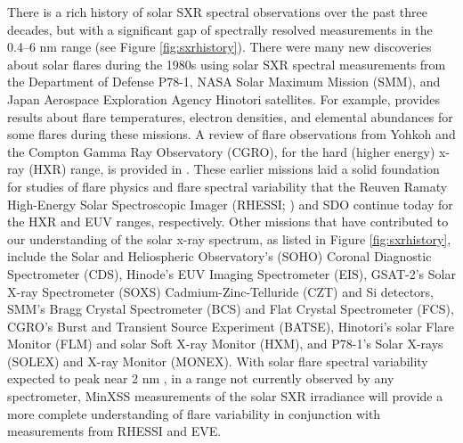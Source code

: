 There is a rich history of solar SXR spectral observations over the past three decades, but with a significant gap of spectrally resolved measurements in the 0.4–6 nm range (see Figure \ref{fig:sxrhistory}). There were many new discoveries about solar flares during the 1980s using solar SXR spectral measurements from the Department of Defense P78-1, NASA Solar Maximum Mission (SMM), and Japan Aerospace Exploration Agency Hinotori satellites. For example, \citet{Doschek1990} provides results about flare temperatures, electron densities, and elemental abundances for some flares during these missions. A review of flare observations from Yohkoh and the Compton Gamma Ray Observatory (CGRO), for the hard (higher energy) x-ray (HXR) range, is provided in \citet{Sterling1997}. These earlier missions laid a solid foundation for studies of flare physics and flare spectral variability that the Reuven Ramaty High-Energy Solar Spectroscopic Imager (RHESSI; \citealt{Lin2002}) and SDO continue today for the HXR and EUV ranges, respectively. Other missions that have contributed to our understanding of the solar x-ray spectrum, as listed in Figure \ref{fig:sxrhistory}, include the Solar and Heliospheric Observatory’s (SOHO) Coronal Diagnostic Spectrometer (CDS), Hinode’s EUV Imaging Spectrometer (EIS), GSAT-2’s Solar X-ray Spectrometer (SOXS) Cadmium-Zinc-Telluride (CZT) and Si detectors, SMM’s Bragg Crystal Spectrometer (BCS) and Flat Crystal Spectrometer (FCS), CGRO’s Burst and Transient Source Experiment (BATSE), Hinotori’s solar Flare Monitor (FLM) and solar Soft X-ray Monitor (HXM), and P78-1’s Solar X-rays (SOLEX) and X-ray Monitor (MONEX). With solar flare spectral variability expected to peak near 2 nm \citep{Rodgers2006}, in a range not currently observed by any spectrometer, MinXSS measurements of the solar SXR irradiance will provide a more complete understanding of flare variability in conjunction with measurements from RHESSI and EVE.

